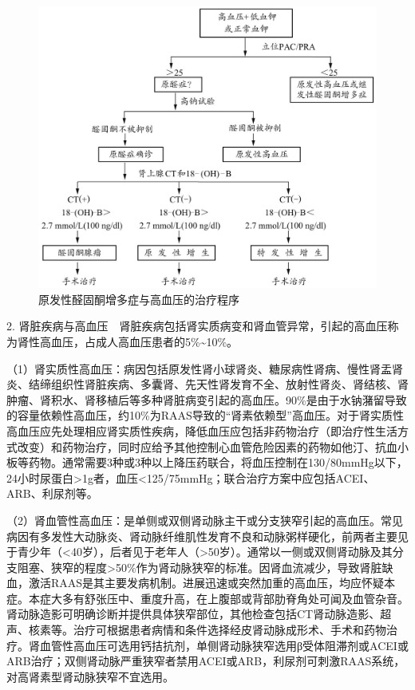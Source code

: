 \begin{figure}[!htbp]
 \centering
 \includegraphics{./images/Image00075.jpg}
 \captionsetup{justification=centering}
 \caption{原发性醛固酮增多症与高血压的治疗程序}
 \label{fig2-7-2}
  \end{figure} 

2.
肾脏疾病与高血压　肾脏疾病包括肾实质病变和肾血管异常，引起的高血压称为肾性高血压，占成人高血压患者的5\%\textasciitilde{}10\%。

（1）肾实质性高血压：病因包括原发性肾小球肾炎、糖尿病性肾病、慢性肾盂肾炎、结缔组织性肾脏疾病、多囊肾、先天性肾发育不全、放射性肾炎、肾结核、肾肿瘤、肾积水、肾移植后等多种肾脏病变引起的高血压。90\%是由于水钠潴留导致的容量依赖性高血压，约10\%为RAAS导致的“肾素依赖型”高血压。对于肾实质性高血压应先处理相应肾实质性疾病，降低血压应包括非药物治疗（即治疗性生活方式改变）和药物治疗，同时应给予其他控制心血管危险因素的药物如他汀、抗血小板等药物。通常需要3种或3种以上降压药联合，将血压控制在130/80mmHg以下，24小时尿蛋白\textgreater{}1g者，血压\textless{}125/75mmHg；联合治疗方案中应包括ACEI、ARB、利尿剂等。

（2）肾血管性高血压：是单侧或双侧肾动脉主干或分支狭窄引起的高血压。常见病因有多发性大动脉炎、肾动脉纤维肌性发育不良和动脉粥样硬化，前两者主要见于青少年（\textless{}40岁），后者见于老年人（\textgreater{}50岁）。通常以一侧或双侧肾动脉及其分支阻塞、狭窄的程度\textgreater{}50\%作为肾动脉狭窄的标准。因肾血流减少，导致肾脏缺血，激活RAAS是其主要发病机制。进展迅速或突然加重的高血压，均应怀疑本症。本症大多有舒张压中、重度升高，在上腹部或背部肋脊角处可闻及血管杂音。肾动脉造影可明确诊断并提供具体狭窄部位，其他检查包括CT肾动脉造影、超声、核素等。治疗可根据患者病情和条件选择经皮肾动脉成形术、手术和药物治疗。肾血管性高血压可选用钙拮抗剂，单侧肾动脉狭窄选用β受体阻滞剂或ACEI或ARB治疗；双侧肾动脉严重狭窄者禁用ACEI或ARB，利尿剂可刺激RAAS系统，对高肾素型肾动脉狭窄不宜选用。

